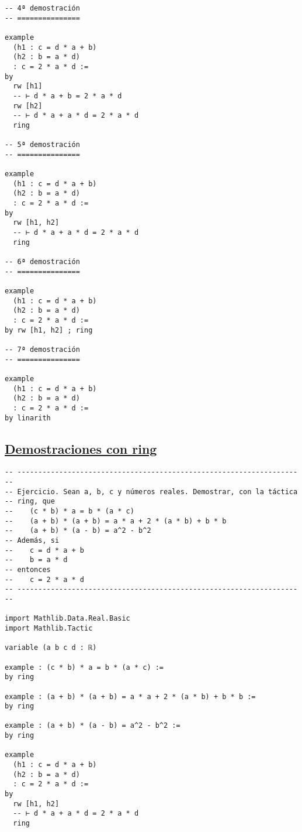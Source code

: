 \begin{verbatim}
-- 4ª demostración
-- ===============

example
  (h1 : c = d * a + b)
  (h2 : b = a * d)
  : c = 2 * a * d :=
by
  rw [h1]
  -- ⊢ d * a + b = 2 * a * d
  rw [h2]
  -- ⊢ d * a + a * d = 2 * a * d
  ring

-- 5ª demostración
-- ===============

example
  (h1 : c = d * a + b)
  (h2 : b = a * d)
  : c = 2 * a * d :=
by
  rw [h1, h2]
  -- ⊢ d * a + a * d = 2 * a * d
  ring

-- 6ª demostración
-- ===============

example
  (h1 : c = d * a + b)
  (h2 : b = a * d)
  : c = 2 * a * d :=
by rw [h1, h2] ; ring

-- 7ª demostración
-- ===============

example
  (h1 : c = d * a + b)
  (h2 : b = a * d)
  : c = 2 * a * d :=
by linarith
\end{verbatim}

\subsection{\href{./src/Basicos/Demostraciones\_con\_ring.lean}{Demostraciones con ring}}
\label{sec:orgde20383}
\begin{verbatim}
-- ---------------------------------------------------------------------
-- Ejercicio. Sean a, b, c y números reales. Demostrar, con la táctica
-- ring, que
--    (c * b) * a = b * (a * c)
--    (a + b) * (a + b) = a * a + 2 * (a * b) + b * b
--    (a + b) * (a - b) = a^2 - b^2
-- Además, si
--    c = d * a + b
--    b = a * d
-- entonces
--    c = 2 * a * d
-- ---------------------------------------------------------------------

import Mathlib.Data.Real.Basic
import Mathlib.Tactic

variable (a b c d : ℝ)

example : (c * b) * a = b * (a * c) :=
by ring

example : (a + b) * (a + b) = a * a + 2 * (a * b) + b * b :=
by ring

example : (a + b) * (a - b) = a^2 - b^2 :=
by ring

example
  (h1 : c = d * a + b)
  (h2 : b = a * d)
  : c = 2 * a * d :=
by
  rw [h1, h2]
  -- ⊢ d * a + a * d = 2 * a * d
  ring
\end{verbatim}

